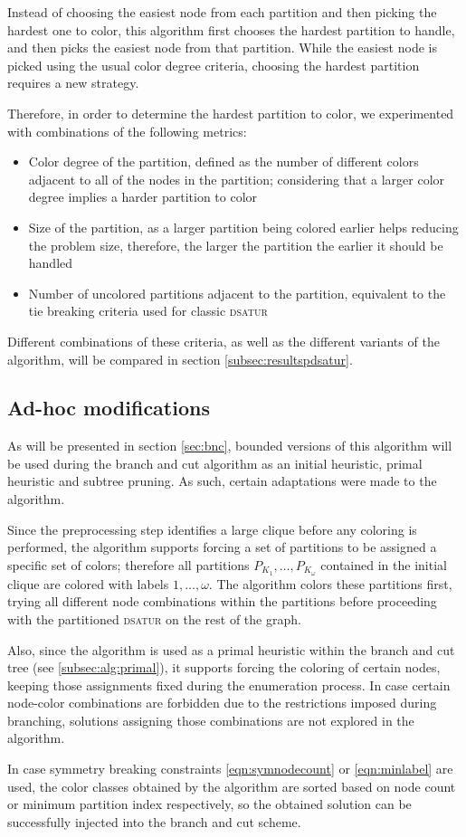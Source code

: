 Instead of choosing the easiest node from each partition and then picking the hardest one to color, this algorithm first chooses the hardest partition to handle, and then picks the easiest node from that partition. While the easiest node is picked using the usual color degree criteria, choosing the hardest partition requires a new strategy. 

Therefore, in order to determine the hardest partition to color, we experimented with combinations of the following metrics:
\begin{itemize}
	\item{Color degree of the partition, defined as the number of different colors adjacent to all of the nodes in the partition; considering that a larger color degree implies a harder partition to color}
	\item{Size of the partition, as a larger partition being colored earlier helps reducing the problem size, therefore, the larger the partition the earlier it should be handled}
	\item{Number of uncolored partitions adjacent to the partition, equivalent to the tie breaking criteria used for classic \textsc{dsatur}} 
\end{itemize}

Different combinations of these criteria, as well as the different variants of the algorithm, will be compared in section \ref{subsec:resultspdsatur}.

\subsection{Ad-hoc modifications}

As will be presented in section \ref{sec:bnc}, bounded versions of this algorithm will be used during the branch and cut algorithm as an initial heuristic, primal heuristic and subtree pruning. As such, certain adaptations were made to the algorithm.

Since the preprocessing step identifies a large clique before any coloring is performed, the algorithm supports forcing a set of partitions to be assigned a specific set of colors; therefore all partitions $P_{K_1},\ldots,P_{K_\omega}$ contained in the initial clique are colored with labels $1,\ldots,\omega$. The algorithm colors these partitions first, trying all different node combinations within the partitions before proceeding with the partitioned \textsc{dsatur} on the rest of the graph.

Also, since the algorithm is used as a primal heuristic within the branch and cut tree (see \ref{subsec:alg:primal}), it supports forcing the coloring of certain nodes, keeping those assignments fixed during the enumeration process. In case certain node-color combinations are forbidden due to the restrictions imposed during branching, solutions assigning those combinations are not explored in the algorithm.

In case symmetry breaking constraints \ref{eqn:symnodecount} or \ref{eqn:minlabel} are used, the color classes obtained by the algorithm are sorted based on node count or minimum partition index respectively, so the obtained solution can be successfully injected into the branch and cut scheme.

